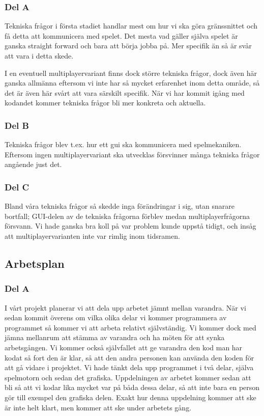 \documentclass[10pt,a4paper]{article}
\begin{document}
\subsubsection*{Del A}

Tekniska frågor i första stadiet handlar mest om hur vi ska göra
gränssnittet och få detta att kommunicera med spelet. Det mesta vad gäller
själva spelet är ganska straight forward och bara att börja jobba på. Mer
specifik än så är svår att vara i detta skede.

I en eventuell multiplayervariant finns dock större tekniska frågor, dock
även här ganska allmänna eftersom vi inte har så mycket erfarenhet inom
detta område, så det är även här svårt att vara särskilt specifik. När vi
har kommit igång med kodandet kommer tekniska frågor bli mer konkreta och
aktuella.

\subsubsection*{Del B}

Tekniska frågor blev t.ex. hur ett gui ska kommunicera med spelmekaniken.
Eftersom ingen multiplayervariant ska utvecklas försvinner många tekniska
frågor angående just det.

\subsubsection*{Del C}

Bland våra tekniska frågor så skedde inga förändringar i sig, utan snarare bortfall;
GUI-delen av de tekniska frågorna förblev medan multiplayerfrågorna
försvann. Vi hade ganska bra koll på var problem kunde uppstå tidigt, och
insåg att multiplayervarianten inte var rimlig inom tidsramen.

\subsection*{Arbetsplan}

\subsubsection*{Del A}

I vårt projekt planerar vi att dela upp arbetet jämnt mellan varandra. När
vi sedan kommit överens om vilka olika delar vi kommer programmera av
programmet så kommer vi att arbeta relativt självständig. Vi kommer dock
med jämna mellanrum att stämma av varandra och ha möten för att synka
arbetsgången. Vi kommer också självfallet att ge varandra den kod man har
kodat så fort den är klar, så att den andra personen kan använda den koden
för att gå vidare i projektet. Vi hade tänkt dela upp programmet i två
delar, själva spelmotorn och sedan det grafiska. Uppdelningen av arbetet
kommer sedan att bli så att vi kodar lika mycket var på båda dessa delar,
så att inte bara en person gör till exempel den grafiska delen. Exakt hur
denna uppdelning kommer att ske är inte helt klart, men kommer att ske
under arbetets gång.
\end{document}
